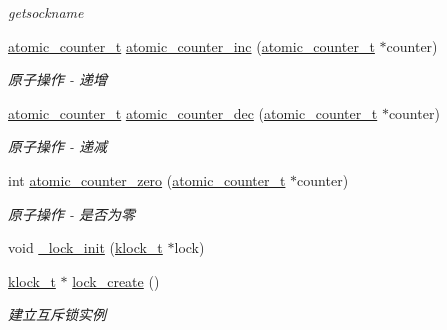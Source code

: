 \begin{DoxyCompactItemize}
\begin{DoxyCompactList}\small\item\em getsockname \end{DoxyCompactList}\item 
\hyperlink{a00053_a0d043bbb6b8db19fea54ab9271d352b6_a0d043bbb6b8db19fea54ab9271d352b6}{atomic\+\_\+counter\+\_\+t} \hyperlink{a00112_gade4f41f1cd519f2719b5114ce7801232_gade4f41f1cd519f2719b5114ce7801232}{atomic\+\_\+counter\+\_\+inc} (\hyperlink{a00053_a0d043bbb6b8db19fea54ab9271d352b6_a0d043bbb6b8db19fea54ab9271d352b6}{atomic\+\_\+counter\+\_\+t} $\ast$counter)
\begin{DoxyCompactList}\small\item\em 原子操作 -\/ 递增 \end{DoxyCompactList}\item 
\hyperlink{a00053_a0d043bbb6b8db19fea54ab9271d352b6_a0d043bbb6b8db19fea54ab9271d352b6}{atomic\+\_\+counter\+\_\+t} \hyperlink{a00112_gafc2df03d75cf9168b72e8c5e11953437_gafc2df03d75cf9168b72e8c5e11953437}{atomic\+\_\+counter\+\_\+dec} (\hyperlink{a00053_a0d043bbb6b8db19fea54ab9271d352b6_a0d043bbb6b8db19fea54ab9271d352b6}{atomic\+\_\+counter\+\_\+t} $\ast$counter)
\begin{DoxyCompactList}\small\item\em 原子操作 -\/ 递减 \end{DoxyCompactList}\item 
int \hyperlink{a00112_ga141897cac9743394a99ff7780daa6a80_ga141897cac9743394a99ff7780daa6a80}{atomic\+\_\+counter\+\_\+zero} (\hyperlink{a00053_a0d043bbb6b8db19fea54ab9271d352b6_a0d043bbb6b8db19fea54ab9271d352b6}{atomic\+\_\+counter\+\_\+t} $\ast$counter)
\begin{DoxyCompactList}\small\item\em 原子操作 -\/ 是否为零 \end{DoxyCompactList}\item 
void \hyperlink{a00084_a9aec45e2aae3dcc89d489947bcec36a5_a9aec45e2aae3dcc89d489947bcec36a5}{\+\_\+lock\+\_\+init} (\hyperlink{a00053_a4c2f62ab63ab1fd49c71e52bbda0f393_a4c2f62ab63ab1fd49c71e52bbda0f393}{klock\+\_\+t} $\ast$lock)
\item 
\hyperlink{a00053_a4c2f62ab63ab1fd49c71e52bbda0f393_a4c2f62ab63ab1fd49c71e52bbda0f393}{klock\+\_\+t} $\ast$ \hyperlink{a00084_a7860cb0060346d30b45ea9cb824c2be0_a7860cb0060346d30b45ea9cb824c2be0}{lock\+\_\+create} ()
\begin{DoxyCompactList}\small\item\em 建立互斥锁实例 \end{DoxyCompactList}\item 

\end{DoxyCompactItemize}
